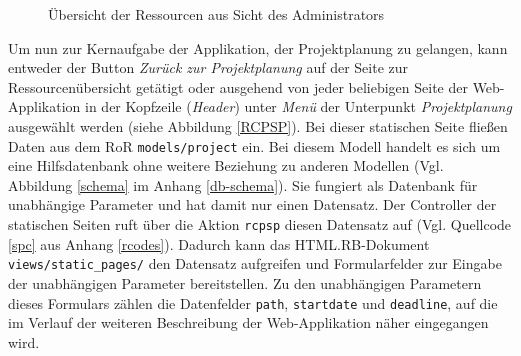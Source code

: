 \documentclass[a4paper,12pt,parskip,bibtotoc,liststotoc]{article}
\begin{document}
\begin{figure}[h!]
  \begin{center}
    \caption{Übersicht der Ressourcen aus Sicht des Administrators}  \label{ResAd}
  \end{center}
\end{figure}     
  
Um nun zur Kernaufgabe der Applikation, der Projektplanung zu gelangen, kann entweder der Button \textit{Zurück zur Projektplanung} auf der Seite zur Ressourcenübersicht getätigt oder ausgehend von jeder beliebigen Seite der Web-Applikation in der Kopfzeile (\textit{Header}) unter \textit{Menü} der Unterpunkt \textit{Projektplanung} ausgewählt werden (siehe Abbildung \ref{RCPSP}). Bei dieser statischen Seite fließen Daten aus dem RoR \texttt{models/project} ein. Bei diesem Modell handelt es sich um eine Hilfsdatenbank ohne weitere Beziehung zu anderen Modellen (Vgl. Abbildung \ref{schema} im Anhang \ref{db-schema}). Sie fungiert als Datenbank für unabhängige Parameter und hat damit nur einen Datensatz. Der Controller der statischen Seiten ruft über die Aktion \texttt{rcpsp} diesen Datensatz auf (Vgl. Quellcode \ref{spc} aus Anhang \ref{rcodes}). Dadurch kann das HTML.RB-Dokument \texttt{views/static\_pages/} den Datensatz aufgreifen und Formularfelder zur Eingabe der unabhängigen Parameter bereitstellen. Zu den unabhängigen Parametern dieses Formulars zählen die Datenfelder \texttt{path}, \texttt{startdate} und \texttt{deadline}, auf die im Verlauf der weiteren Beschreibung der Web-Applikation näher eingegangen wird.\\ %
\end{document}
